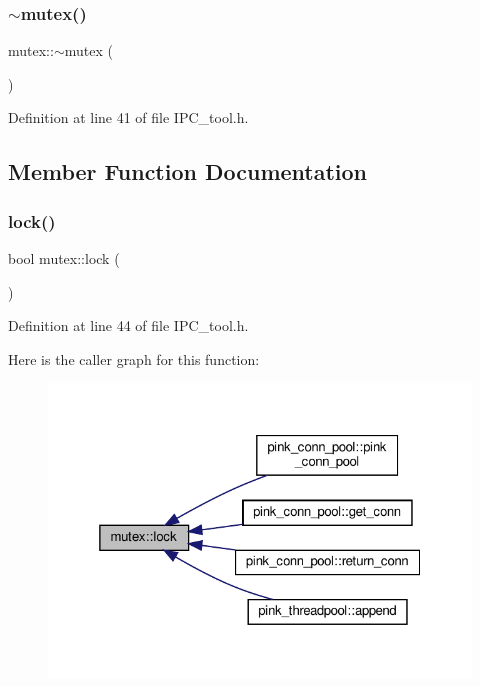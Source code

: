 \mbox{\label{classmutex_ae30185d87a48c5451a04c2861ba3d034}} 
\subsubsection{\texorpdfstring{$\sim$mutex()}{~mutex()}}
{\footnotesize\ttfamily mutex\+::$\sim$mutex (\begin{DoxyParamCaption}{ }\end{DoxyParamCaption})\hspace{0.3cm}{\ttfamily [inline]}}



Definition at line 41 of file I\+P\+C\+\_\+tool.\+h.



\subsection{Member Function Documentation}
\mbox{\label{classmutex_afc56ba139d699d2d9d388141209c6e43}} 
\subsubsection{\texorpdfstring{lock()}{lock()}}
{\footnotesize\ttfamily bool mutex\+::lock (\begin{DoxyParamCaption}{ }\end{DoxyParamCaption})\hspace{0.3cm}{\ttfamily [inline]}}



Definition at line 44 of file I\+P\+C\+\_\+tool.\+h.

Here is the caller graph for this function\+:
\nopagebreak
\begin{figure}[H]
\begin{center}
\leavevmode
\includegraphics[width=325pt]{classmutex_afc56ba139d699d2d9d388141209c6e43_icgraph}
\end{center}
\end{figure}
\mbox{\label{classmutex_a47bc4d60f08056af411b57e321959fe1}} 
